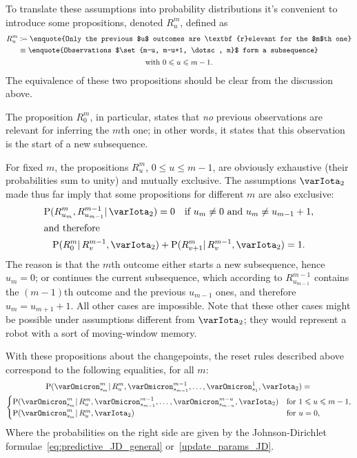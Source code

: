 \documentclass[\ifafour a4paper,12pt,\else a5paper,10pt,\fi%
onecolumn,oneside,article,%
british%
]{memoir}
\theoremstyle{remark}
\theoremstyle{innote}
\newcommand*{\defd}{\coloneqq}
\renewcommand{\le}{\leqslant}%
\DeclarePairedDelimiter\set{\{}{\}}
\newcommand*{\p}{\mathrm{P}}%
\renewcommand*{\|}{\mathpunct{|}}
\newcommand*{\yI}{\varIota}
\newcommand*{\yO}{\varOmicron}
\newcommand*{\yMc}{\yI_2}
\begin{document}
To translate these assumptions into probability distributions it's
convenient to introduce some propositions, denoted $R^{m}_{u}$, defined as
\begin{multline}
  \label{eq:def_prop_changepoint}
  \begin{aligned}
    R^{m}_{u}
    &\defd \text{\enquote{Only the previous $u$ outcomes are \textbf{r}elevant for the $m$th one}}
    \\
    &\equiv\text{\enquote{Observations $\set{m-u, m-u+1, \dotsc, m}$ form a subsequence}}
  \end{aligned}
  \\ \text{with $0\le u \le m-1$}.
\end{multline}
The equivalence of these two propositions should be clear from the
discussion above.

The proposition $R^{m}_{0}$, in particular, states that \emph{no} previous
observations are relevant for inferring the $m$th one; in other words, it
states that this observation is the start of a new subsequence.

For fixed $m$, the propositions $R^{m}_{u}$, $0\le u \le m-1$, are
obviously exhaustive (their probabilities sum to unity) and mutually
exclusive. The assumptions $\yMc$ made thus far imply that some
propositions for different $m$ are also exclusive:
\begin{gather}
  \label{eq:exclusive_across_m}
  \p(R^{m}_{u_{m}}, R^{m-1}_{u_{m-1}} \| \yMc) = 0
  \quad\text{if $u_{m}\ne 0$ and $u_{m} \ne u_{m-1}+1$},
\\\intertext{and therefore}
  \label{eq:exhaustive_R_from_previous}
  \p(R^{m}_{0} \| R^{m-1}_{v},\yMc) +
  \p(R^{m}_{v+1} \| R^{m-1}_{v},\yMc) = 1.
\end{gather}
The reason is that the $m$th outcome either starts a new subsequence, hence
$u_{m}=0$; or continues the current subsequence, which according to
$R^{m-1}_{u_{m-1}}$ contains the $(m-1)$th outcome and the previous
$u_{m-1}$ ones, and therefore $u_{m}=u_{m+1}+1$. All other cases are
impossible. Note that these other cases might be possible under assumptions
different from $\yMc$; they would represent a robot with a sort of
moving-window memory.

With these propositions about the changepoints, the reset rules described
above correspond to the following equalities, for all $m$:
\begin{multline}
  \label{eq:irrelevant_data_conditional_R}
  \p(\yO^{m}_{s_{m}} \|
  R^{m}_{u},  \yO^{m-1}_{s_{m-1}}, \dotsc, \yO^{1}_{s_{1}}, \yMc)
  ={}\\
  \begin{cases}
  \p(\yO^{m}_{s_{m}} \|
    R^{m}_{u},  \yO^{m-1}_{s_{m-1}}, \dotsc, \yO^{m-u}_{s_{m-u}}, \yMc)
    &\text{for $1\le u\le m-1$},
      \\
  \p(\yO^{m}_{s_{m}} \|
    R^{m}_{u}, \yMc)
    &\text{for $u=0$},
  \end{cases}
\end{multline}
Where the probabilities on the right side are given by the
Johnson-Dirichlet formulae~\eqref{eq:predictive_JD_general}
or~\eqref{update_params_JD}.
\end{document}
